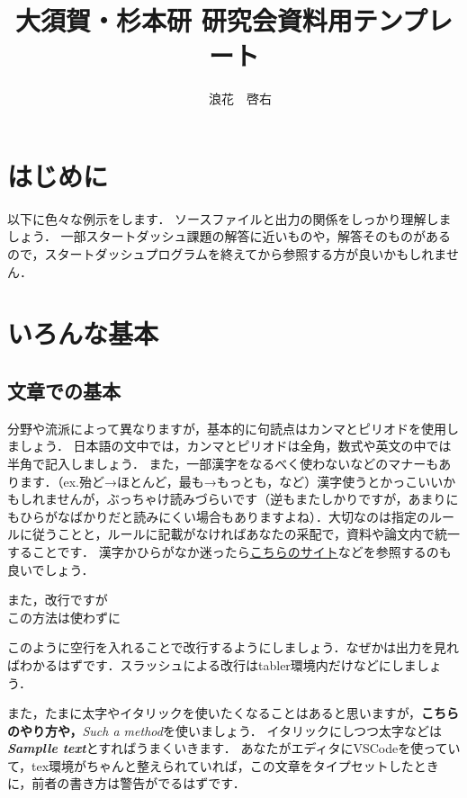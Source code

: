 \documentclass[platex,dvipdfmx]{jlreq}%
\title{大須賀・杉本研 研究会資料用テンプレート}
\author{
    　浪花　啓右
     }
\numberwithin{equation}{section}%
\begin{document}
\maketitle
\thispagestyle{empty}
%
\section{はじめに}
以下に色々な例示をします．
ソースファイルと出力の関係をしっかり理解しましょう．
一部スタートダッシュ課題の解答に近いものや，解答そのものがあるので，スタートダッシュプログラムを終えてから参照する方が良いかもしれません．

\section{いろんな基本}

\subsection{文章での基本}
分野や流派によって異なりますが，基本的に句読点はカンマとピリオドを使用しましょう．
日本語の文中では，カンマとピリオドは全角，数式や英文の中では半角で記入しましょう．
また，一部漢字をなるべく使わないなどのマナーもあります．（ex.殆ど→ほとんど，最も→もっとも，など）漢字使うとかっこいいかもしれませんが，ぶっちゃけ読みづらいです（逆もまたしかりですが，あまりにもひらがなばかりだと読みにくい場合もありますよね）．大切なのは指定のルールに従うことと，ルールに記載がなければあなたの采配で，資料や論文内で統一することです．
漢字かひらがなか迷ったら\href{http://www.yamanouchi-yri.com/yrihp/techwrt-2-4s/t-2-4s03a.htm}{こちらのサイト}などを参照するのも良いでしょう．


また，改行ですが\\
この方法は使わずに

このように空行を入れることで改行するようにしましょう．なぜかは出力を見ればわかるはずです．スラッシュによる改行はtabler環境内だけなどにしましょう．

また，たまに太字やイタリックを使いたくなることはあると思いますが，\textbf{こちらのやり方や，}\textit{Such a method}を使いましょう．
イタリックにしつつ太字などは\textbf{\textit{Samplle text}}とすればうまくいきます．
あなたがエディタにVSCodeを使っていて，tex環境がちゃんと整えられていれば，この文章をタイプセットしたときに，前者の書き方は警告がでるはずです．
\end{document}
